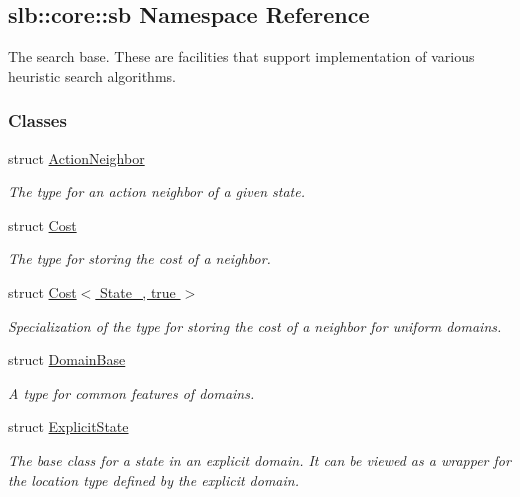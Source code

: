 \hypertarget{namespaceslb_1_1core_1_1sb}{}\subsection{slb\+:\+:core\+:\+:sb Namespace Reference}
\label{namespaceslb_1_1core_1_1sb}


The search base. These are facilities that support implementation of various heuristic search algorithms.  


\subsubsection*{Classes}
\begin{DoxyCompactItemize}
\item 
struct \hyperlink{structslb_1_1core_1_1sb_1_1ActionNeighbor}{Action\+Neighbor}
\begin{DoxyCompactList}\small\item\em The type for an action neighbor of a given state. \end{DoxyCompactList}\item 
struct \hyperlink{structslb_1_1core_1_1sb_1_1Cost}{Cost}
\begin{DoxyCompactList}\small\item\em The type for storing the cost of a neighbor. \end{DoxyCompactList}\item 
struct \hyperlink{structslb_1_1core_1_1sb_1_1Cost_3_01State___00_01true_01_4}{Cost$<$ State\+\_\+, true $>$}
\begin{DoxyCompactList}\small\item\em Specialization of the type for storing the cost of a neighbor for uniform domains. \end{DoxyCompactList}\item 
struct \hyperlink{structslb_1_1core_1_1sb_1_1DomainBase}{Domain\+Base}
\begin{DoxyCompactList}\small\item\em A type for common features of domains. \end{DoxyCompactList}\item 
struct \hyperlink{structslb_1_1core_1_1sb_1_1ExplicitState}{Explicit\+State}
\begin{DoxyCompactList}\small\item\em The base class for a state in an explicit domain. It can be viewed as a wrapper for the location type defined by the explicit domain. \end{DoxyCompactList}\item 

\end{DoxyCompactItemize}
